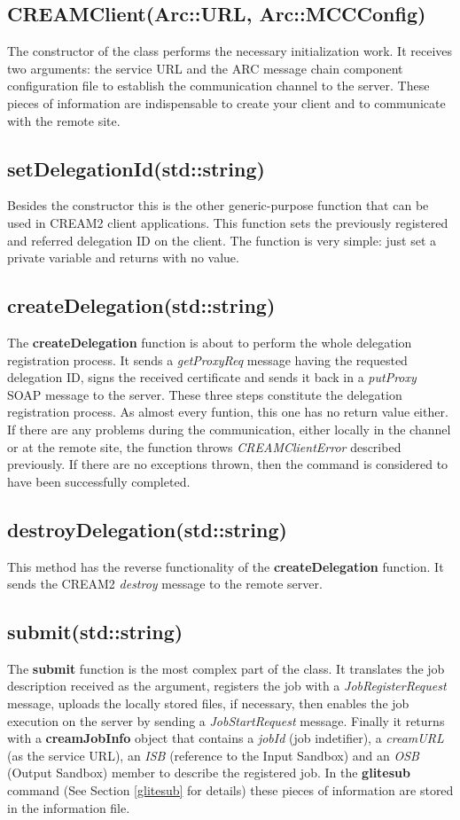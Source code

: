 \documentclass{article}
\begin{document}
\subsection{CREAMClient(Arc::URL, Arc::MCCConfig)}
The constructor of the class performs the necessary initialization work. It receives two arguments: the service URL and the ARC message chain component configuration file to establish the communication channel to the server. These pieces of information are indispensable to create your client and to communicate with the remote site.
\subsection{setDelegationId(std::string)}
Besides the constructor this is the other generic-purpose function that can be used in CREAM2 client applications. This function sets the previously registered and referred delegation ID on the client. The function is very simple: just set a private variable and returns with no value.
\subsection{createDelegation(std::string)}
The \textbf{createDelegation} function is about to perform the whole delegation registration process. It sends a \textit{getProxyReq} message having the requested delegation ID, signs the received certificate and sends it back in a \textit{putProxy} SOAP message to the server. These three steps constitute the delegation registration process.
As almost every funtion, this one has no return value either. If there are any problems during the communication, either locally in the channel or at the remote site, the function throws \textit{CREAMClientError} described previously. If there are no exceptions thrown, then the command is considered to have been successfully completed.
\subsection{destroyDelegation(std::string)}
This method has the reverse functionality of the \textbf{createDelegation} function. It sends the CREAM2 \textit{destroy} message to the remote server.
\subsection{submit(std::string)}
The \textbf{submit} function is the most complex part of the class. It translates the job description received as the argument, registers the job with a \textit{JobRegisterRequest} message, uploads the locally stored files, if necessary, then enables the job execution on the server by sending a \textit{JobStartRequest} message. Finally it returns with a \textbf{creamJobInfo} object that contains a \textit{jobId} (job indetifier), a \textit{creamURL} (as the service URL), an \textit{ISB} (reference to the Input Sandbox) and an \textit{OSB} (Output Sandbox) member to describe the registered job. In the \textbf{glitesub} command (See Section \ref{glitesub} for details) these pieces of information are stored in the information file.
\end{document}
